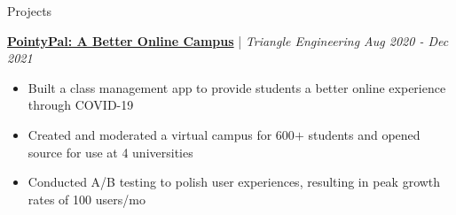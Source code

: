 \documentclass{content/resume/resume}
\begin{document}
\begin{rSection}{Projects}

  \href{https://github.com/UtahTriangle/pointypal#pointypal-zoom-school-done-better}{\bf PointyPal: A Better Online Campus} | {\em Triangle Engineering \hfill Aug 2020 - Dec 2021}
  \vspace{-6pt}
  \begin{itemize}[nosep]
    \item Built a class management app to provide students a better online experience through COVID-19
    \item Created and moderated a virtual campus for 600$+$ students and opened source for use at 4 universities
   \item Conducted A/B testing to polish user experiences, resulting in peak growth rates of 100 users/mo
  \end{itemize}



\end{rSection}
\end{document}
